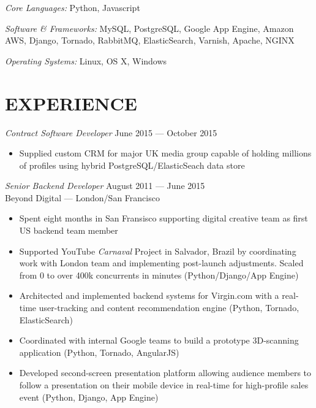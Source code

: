 \documentclass[margin, 10pt]{res}
\begin{document}
\begin{resume}
{\sl Core Languages:}
Python, Javascript

{\sl Software \& Frameworks:}
MySQL, PostgreSQL, Google App Engine, Amazon AWS, Django, Tornado, RabbitMQ, ElasticSearch, Varnish, Apache, NGINX

{\sl Operating Systems:} Linux, OS X, Windows


\section{EXPERIENCE}

{\sl Contract Software Developer} \hfill June 2015 --- October 2015 \\

\begin{itemize} \itemsep -2pt
\item Supplied custom CRM for major UK media group capable of holding millions of profiles using hybrid PostgreSQL/ElasticSeach data store
\end{itemize}

{\sl Senior Backend Developer} \hfill August 2011 --- June 2015 \\
Beyond Digital --- London/San Francisco \\

\begin{itemize} \itemsep -2pt %
\item Spent eight months in San Fransisco supporting digital creative team as first US backend team member
\item Supported YouTube \textit{Carnaval} Project in Salvador, Brazil by coordinating work with London team and implementing post-launch adjustments. Scaled from 0 to over 400k concurrents in minutes (Python/Django/App Engine)
\item Architected and implemented backend systems for Virgin.com with a real-time user-tracking and content recommendation engine (Python, Tornado, ElasticSearch)
\item Coordinated with internal Google teams to build a prototype 3D-scanning application (Python, Tornado, AngularJS)
\item Developed second-screen presentation platform allowing audience members to follow a presentation on their mobile device in real-time for high-profile sales event (Python, Django, App Engine)
\end{itemize}


\end{resume}
\end{document}
